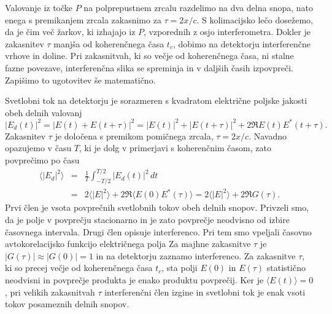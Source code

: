 Valovanje iz točke $P$ na polprepustnem 
zrcalu razdelimo na dva delna snopa, nato enega s premikanjem zrcala zakasnimo za $\tau=2x/c$.
S kolimacijsko lečo dosežemo, da je čim več žarkov, ki izhajajo iz
$P$, vzporednih z osjo interferometra. Dokler je zakasnitev
$\tau$ manjša od koherenčnega časa $t_{c}$,
dobimo na detektorju interferenčne vrhove in doline. Pri zakasnitvah,
ki so večje od koherenčnega časa, ni stalne fazne povezave, interferenčna
slika se spreminja in v daljših časih izpovpreči. Zapišimo to ugotovitev
še matematično.

Svetlobni tok na detektorju je sorazmeren s kvadratom električne
poljske jakosti obeh delnih valovanj
\begin{equation}
|E_{d}(t)|^{2}=|E(t)+E(t+\tau)|^{2}=|E(t)|^{2}+|E(t+\tau)|^{2}+2\Re E(t)E^{*}(t+\tau).
\label{eq:Michelson-intenziteta}
\end{equation}
Zakasnitev $\tau$ je določena s premikom pomičnega zrcala, $\tau=2x/c$.
Navadno opazujemo v času $T$, ki je dolg v primerjavi s koherenčnim
časom, zato povprečimo po času
\begin{eqnarray}
\langle|E_{d}|^{2}\rangle & = & \frac{1}{T}\int_{-T/2}^{T/2}|E{}_{d}(t)|^{2}\, dt\nonumber \\
 & = & 2\langle|E|^{2}\rangle+2\Re\langle E(0)E^{*}(\tau)\rangle = 2\langle|E|^{2}\rangle+2\Re G(\tau).
\end{eqnarray}
Prvi člen je vsota povprečnih svetlobnih tokov obeh delnih snopov. Privzeli
smo, da je polje v povprečju stacionarno in je zato povprečje neodvisno
od izbire časovnega intervala. Drugi člen opisuje interferenco. 
Pri tem smo vpeljali
časovno avtokorelacijsko funkcijo
električnega polja 
Za majhne zakasnitve $\tau$ je $|G(\tau)|\approx|G(0)|=1$ in na
detektorju zaznamo interferenco. Za zakasnitve $\tau,$ ki so precej
večje od koherenčnega časa $t_{c}$, sta polji $E(0)$ in $E(\tau)$
statistično neodvisni in povprečje produkta je enako produktu povprečij.
Ker je $\langle E(t)\rangle=0$, pri velikih zakasnitvah $\tau$ interferenčni
člen izgine in svetlobni tok je enak vsoti tokov posameznih delnih
snopov. 

